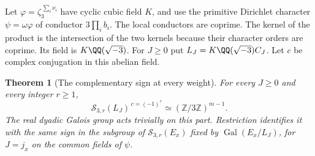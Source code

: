 \documentclass[a4paper,11pt]{article}
\newtheorem{theorem}[proposition]{Theorem}
\theoremstyle{definition}
\theoremstyle{remark}
\newcommand{\ZZ}{\mathbb Z}\newcommand{\ord}{\operatorname{ord}}
\numberwithin{equation}{section}
\begin{document}
Let \(\varphi=\zeta_3^{\,\sum_i\nu_i}\) have cyclic cubic field
\(K\), and use the primitive Dirichlet character
\(\psi=\omega\varphi\) of conductor \(3\prod_i b_i\). The local
conductors are coprime. The kernel of the product is the
intersection of the two kernels because their character orders
are coprime. Its field is \(K\QQ(\sqrt{-3})\). For \(J\ge0\) put \(L_J=K\QQ(\sqrt{-3})C_J\).
Let \(c\) be complex conjugation in this abelian field.

\begin{theorem}[The complementary sign at every weight]
\leavevmode\label{thm:sexticweights669}
For every \(J\ge0\) and every integer \(r\ge1\),
\[
  \mathcal S_{3,r}(L_J)^{\,c=(-1)^r}\simeq(\ZZ/3\ZZ)^{m-1}.
\]
The real dyadic Galois group acts trivially on this part.
Restriction identifies it with the same sign in the subgroup
of \(\mathcal S_{3,r}(E_x)\) fixed by
\(\operatorname{Gal}(E_x/L_J)\), for \(J=j_x\) on the common
fields of \(\psi\).
\end{theorem}
\end{document}

